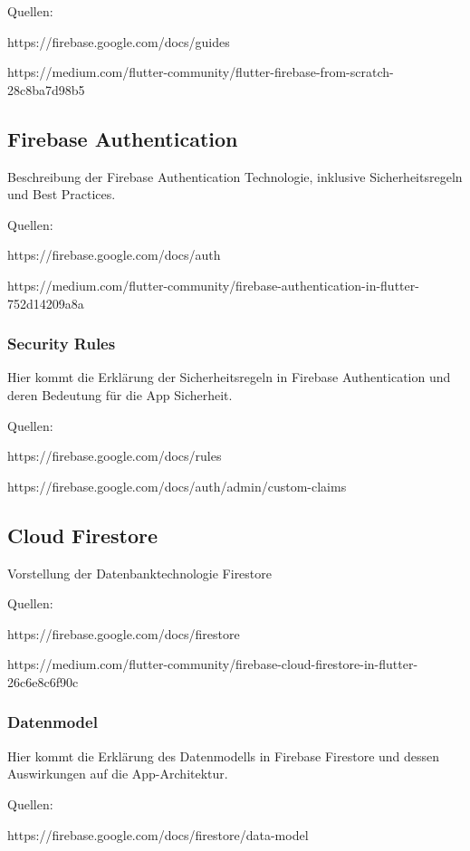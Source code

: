 Quellen:

https://firebase.google.com/docs/guides

https://medium.com/flutter-community/flutter-firebase-from-scratch-28c8ba7d98b5

\subsection{Firebase Authentication}

Beschreibung der Firebase Authentication Technologie, inklusive Sicherheitsregeln und Best Practices.

Quellen:

https://firebase.google.com/docs/auth

https://medium.com/flutter-community/firebase-authentication-in-flutter-752d14209a8a

\subsubsection{Security Rules}
\author{Martin Hausleitner}


Hier kommt die Erklärung der Sicherheitsregeln in Firebase Authentication und deren Bedeutung für die App Sicherheit.

Quellen:

https://firebase.google.com/docs/rules

https://firebase.google.com/docs/auth/admin/custom-claims

\subsection{Cloud Firestore}

Vorstellung der Datenbanktechnologie Firestore

Quellen:

https://firebase.google.com/docs/firestore

https://medium.com/flutter-community/firebase-cloud-firestore-in-flutter-26c6e8c6f90c

\subsubsection{Datenmodel}

Hier kommt die Erklärung des Datenmodells in Firebase Firestore und dessen Auswirkungen auf die App-Architektur.

Quellen:

https://firebase.google.com/docs/firestore/data-model

